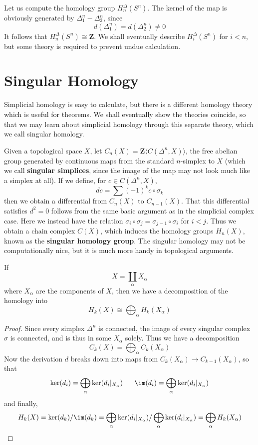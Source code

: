 \begin{example}
    Let us compute the homology group $H^\Delta_n(S^n)$. The kernel of the map is obviously generated by $\Delta^n_1 - \Delta^n_2$, since
    \[ d(\Delta^n_1) = d(\Delta^n_2) \neq 0 \]
    It follows that $H^\Delta_n(S^n) \cong \mathbf{Z}$. We shall eventually describe $H^\Delta_i(S^n)$ for $i < n$, but some theory is required to prevent undue calculation.
\end{example}

\section{Singular Homology}

Simplicial homology is easy to calculate, but there is a different homology theory which is useful for theorems. We shall eventually show the theories coincide, so that we may learn about simplicial homology through this separate theory, which we call singular homology.

Given a topological space $X$, let $C_n(X) = \mathbf{Z}\langle C(\Delta^n, X) \rangle$, the free abelian group generated by continuous maps from the standard $n$-simplex to $X$ (which we call {\bf singular simplices}, since the image of the map may not look much like a simplex at all). If we define, for $c \in C(\Delta^n, X)$,
%
\[ dc = \sum (-1)^k c \circ \sigma_k \]
%
then we obtain a differential from $C_n(X)$ to $C_{n-1}(X)$. That this differential satisfies $d^2 = 0$ follows from the same basic argument as in the simplicial complex case. Here we instead have the relation $\sigma_i \circ \sigma_j = \sigma_{j-1} \circ \sigma_i$ for $i < j$. Thus we obtain a chain complex $C(X)$, which induces the homology groups $H_n(X)$, known as the {\bf singular homology group}. The singular homology may not be computationally nice, but it is much more handy in topological arguments.

\begin{theorem}
    If
    \[ X = \coprod_\alpha X_\alpha \]
    where $X_\alpha$ are the components of $X$, then we have a decomposition of the homology into
    \[ H_k(X) \cong \bigoplus_\alpha H_k(X_\alpha) \]
\end{theorem}
\begin{proof}
    Since every simplex $\Delta^n$ is connected, the image of every singular complex $\sigma$ is connected, and is thus in some $X_\alpha$ solely. Thus we have a decomposition
    \[ C_k(X) = \bigoplus_\alpha C_k(X_\alpha) \]
    Now the derivation $d$ breaks down into maps from $C_k(X_\alpha) \to C_{k-1}(X_\alpha)$, so that
    \[ \ker(d_i) = \bigoplus_\alpha \ker(d_i|_{X_\alpha})\ \ \ \ \ \im(d_i) = \bigoplus_\alpha \ker(d_i|_{X_\alpha}) \]
    and finally,
    \[ H_k(X) = \ker(d_k)/\im(d_k) = \bigoplus_\alpha \ker(d_i|_{X_\alpha})/ \bigoplus_\alpha \ker(d_i|_{X_\alpha}) = \bigoplus_\alpha H_k(X_\alpha) \]
\end{proof}

